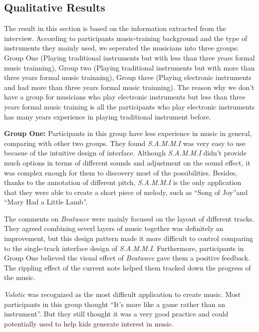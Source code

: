 \subsection{Qualitative Results}

The result in this section is based on the information extracted from the interview. According to participants music-training background and the type of instruments they mainly used, we seperated the musicians into three groups: Group One (Playing traditional instruments but with less than three years formal music trainning), Group two (Playing traditional instruments but with more than three years formal music trainning), Group three (Playing electronic instruments and had more than three years formal music trainning). The reason why we don't have a group for musicians who play electronic instruments but less than three years formal music training is all the participants who play electronic instruments has many years experience in playing traditional instrument before.

\textbf{Group One:} Participants in this group have less experience in music in general, comparing with other two groups. They found \textit{S.A.M.M.I} was very easy to use becasue of the intuitive design of interface. Although \textit{S.A.M.M.I} didn't provide much options in terms of different sounds and adjustment on the sound effect, it was complex enough for them to discovery most of the possibilities. Besides, thanks to the annotation of different pitch, \textit{S.A.M.M.I} is the only application that they were able to create a short piece of melody, such as \textquotedblleft{Song of Joy}\textquotedblright and \textquotedblleft{Mary Had a Little Lamb}\textquotedblright.

The comments on \textit{Beatwave} were mainly focused on the layout of different tracks. They agreed combining severl layers of music together was definitely an improvement, but this design pattern made it more difficult to control comparing to the single-track interface design of \textit{S.A.M.M.I}. Furthermore, participants in Group One believed the visual effect of \textit{Beatwave} gave them a positive feedback. The rippling effect of the current note helped them tracked down the progress of the music.

\textit{Volotic} was recognized as the most difficult application to create music. Most participants in this group thought \textquotedblleft{It's more like a game rather than an instrument}\textquotedblright. But they still thought it was a very good practice and could potentially used to help kids generate interest in music.   


